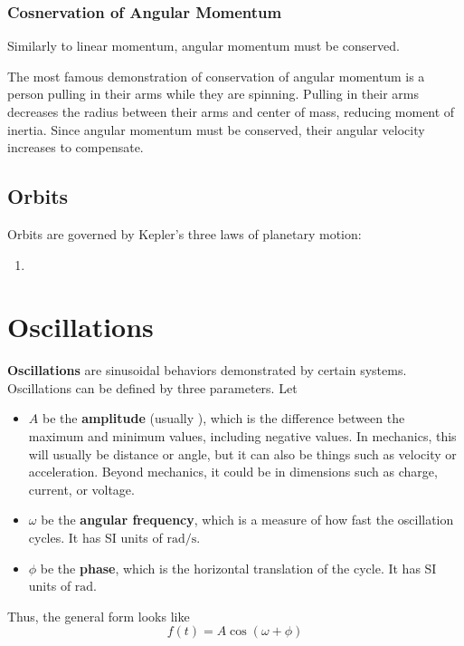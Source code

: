 \documentclass[a4paper, titlepage]{book}
\begin{document}
\subsection{Cosnervation of Angular Momentum}

Similarly to linear momentum, angular momentum must be conserved.

The most famous demonstration of conservation of angular momentum
is a person pulling in their arms while they are spinning.
Pulling in their arms decreases the radius between their arms and center of mass,
reducing moment of inertia.
Since angular momentum must be conserved,
their angular velocity increases to compensate.

\section{Orbits}

Orbits are governed by Kepler's three laws of planetary motion:
\begin{enumerate}
    \item
\end{enumerate}


\chapter{Oscillations}

\textbf{Oscillations} are sinusoidal behaviors demonstrated by certain systems.
Oscillations can be defined by three parameters.
Let
\begin{itemize}
    \item
        \(A\) be the \textbf{amplitude} (usually ),
        which is the difference between the maximum and minimum values,
        including negative values.
        In mechanics, this will usually be distance or angle,
        but it can also be things such as velocity or acceleration.
        Beyond mechanics, it could be in dimensions such as charge, current,
        or voltage.
    \item
        \(\omega\) be the \textbf{angular frequency},
        which is a measure of how fast the oscillation cycles.
        It has SI units of \(\unit{\radian \per \second}\).
    \item
        \(\phi\) be the \textbf{phase},
        which is the horizontal translation of the cycle.
        It has SI units of \(\unit{\radian}\).
\end{itemize}
Thus, the general form looks like
\begin{equation}
    f(t) = A \cos(\omega + \phi)
\end{equation}
\end{document}
